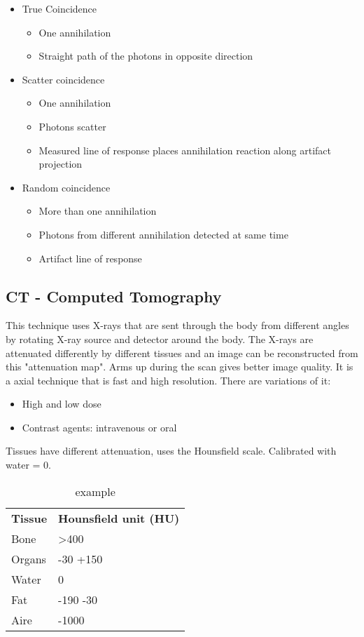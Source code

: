 			\begin{itemize}
			  	\item True Coincidence
			  	\begin{itemize}
			  		\item One annihilation
			  		\item Straight path of the photons in opposite direction 
			  	\end{itemize}
			  	\item Scatter coincidence
			  	\begin{itemize}
			  		\item One annihilation
			  		\item Photons scatter
			  		\item Measured line of response places annihilation reaction along artifact projection
			  	\end{itemize}
			  	\item Random coincidence
			  	\begin{itemize}
			  		\item More than one annihilation
			  		\item Photons from different annihilation detected at same time
			  		\item Artifact line of response 
			  	\end{itemize}
			  \end{itemize}  

	\subsection*{CT - Computed Tomography}
	This technique uses X-rays that are sent through the body from different angles by rotating X-ray source and detector around the body. The X-rays are attenuated differently by different tissues and an image can be reconstructed from this "attenuation map". Arms up during the scan gives better image quality. It is a axial technique that is fast and high resolution. There are variations of it:
		\begin{itemize}
		  	\item High and low dose
		  	\item Contrast agents: intravenous or oral
		 \end{itemize}  
	Tissues have different attenuation, uses the Hounsfield scale. Calibrated with water = 0. 

		\begin{table}[ht!]
		\centering
		\begin{tabular}{ll}\hline
		 \textbf{Tissue}& \textbf{Hounsfield unit (HU)}   \\
		 Bone&    >400\\
		 Organs&   -30 +150\\
		 Water&    0\\
		 Fat&    -190 -30\\
		 Aire&    -1000\\ \hline
		\end{tabular}
		\caption{example}
		\label{tab:tab1}
		\end{table}

